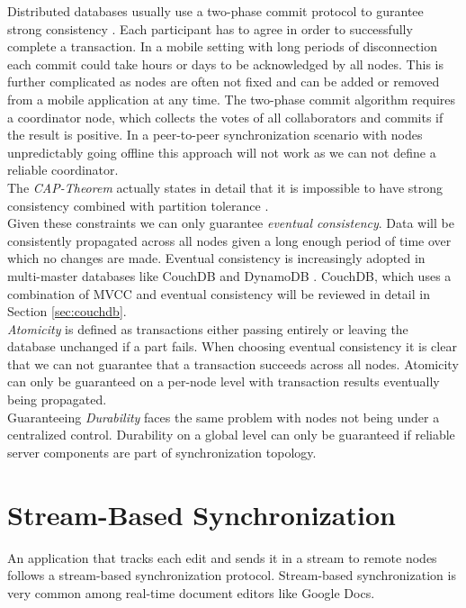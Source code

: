 Distributed databases usually use a two-phase commit protocol to gurantee strong consistency \cite{bernstein1987concurrency}.
Each participant has to agree in order to successfully complete a transaction.
In a mobile setting with long periods of disconnection each commit could take hours or days to be acknowledged by all nodes.
This is further complicated as nodes are often not fixed and can be added or removed from a mobile application at any time.
The two-phase commit algorithm requires a coordinator node, which collects the votes of all collaborators and commits if the result is positive.
In a peer-to-peer synchronization scenario with nodes unpredictably going offline this approach will not work as we can not define a reliable coordinator.\\
The \emph{CAP-Theorem} actually states in detail that it is impossible to have strong consistency combined with partition tolerance \cite{Gilbert:2002uw}.\\
Given these constraints we can only guarantee \emph{eventual consistency}.
Data will be consistently propagated across all nodes given a long enough period of time over which no changes are made.
Eventual consistency is increasingly adopted in multi-master databases like CouchDB \cite{anderson2010couchdb} and DynamoDB \cite{DeCandia:2007ui}.
CouchDB, which uses a combination of MVCC and eventual consistency will be reviewed in detail in Section \ref{sec:couchdb}.\\
\emph{Atomicity} is defined as transactions either passing entirely or leaving the database unchanged if a part fails.
When choosing eventual consistency it is clear that we can not guarantee that a transaction succeeds across all nodes.
Atomicity can only be guaranteed on a per-node level with transaction results eventually being propagated.\\
Guaranteeing \emph{Durability} faces the same problem with nodes not being under a centralized control.
Durability on a global level can only be guaranteed if reliable server components are part of synchronization topology.

\section{Stream-Based Synchronization}
\label{sec:background.stream-based}
An application that tracks each edit and sends it in a stream to remote nodes follows a stream-based synchronization protocol.
Stream-based synchronization is very common among real-time document editors like Google Docs.\\

